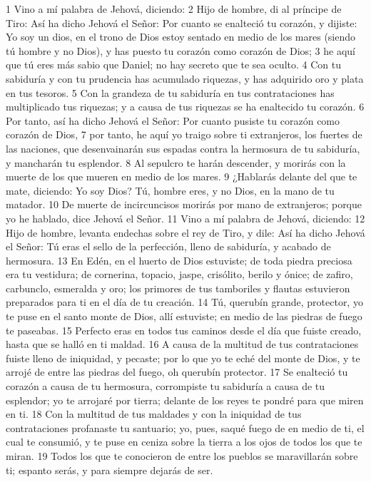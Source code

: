 1 Vino a mí palabra de Jehová, diciendo:
2 Hijo de hombre, di al príncipe de Tiro: Así ha dicho Jehová el Señor: Por cuanto se enalteció tu corazón, y dijiste: Yo soy un dios, en el trono de Dios estoy sentado en medio de los mares (siendo tú hombre y no Dios), y has puesto tu corazón como corazón de Dios;
3 he aquí que tú eres más sabio que Daniel; no hay secreto que te sea oculto.
4 Con tu sabiduría y con tu prudencia has acumulado riquezas, y has adquirido oro y plata en tus tesoros.
5 Con la grandeza de tu sabiduría en tus contrataciones has multiplicado tus riquezas; y a causa de tus riquezas se ha enaltecido tu corazón.
6 Por tanto, así ha dicho Jehová el Señor: Por cuanto pusiste tu corazón como corazón de Dios,
7 por tanto, he aquí yo traigo sobre ti extranjeros, los fuertes de las naciones, que desenvainarán sus espadas contra la hermosura de tu sabiduría, y mancharán tu esplendor.
8 Al sepulcro te harán descender, y morirás con la muerte de los que mueren en medio de los mares.
9 ¿Hablarás delante del que te mate, diciendo: Yo soy Dios? Tú, hombre eres, y no Dios, en la mano de tu matador.
10 De muerte de incircuncisos morirás por mano de extranjeros; porque yo he hablado, dice Jehová el Señor.
11 Vino a mí palabra de Jehová, diciendo:
12 Hijo de hombre, levanta endechas sobre el rey de Tiro, y dile: Así ha dicho Jehová el Señor: Tú eras el sello de la perfección, lleno de sabiduría, y acabado de hermosura.
13 En Edén, en el huerto de Dios estuviste; de toda piedra preciosa era tu vestidura; de cornerina, topacio, jaspe, crisólito, berilo y ónice; de zafiro, carbunclo, esmeralda y oro; los primores de tus tamboriles y flautas estuvieron preparados para ti en el día de tu creación.
14 Tú, querubín grande, protector, yo te puse en el santo monte de Dios, allí estuviste; en medio de las piedras de fuego te paseabas.
15 Perfecto eras en todos tus caminos desde el día que fuiste creado, hasta que se halló en ti maldad.
16 A causa de la multitud de tus contrataciones fuiste lleno de iniquidad, y pecaste; por lo que yo te eché del monte de Dios, y te arrojé de entre las piedras del fuego, oh querubín protector.
17 Se enalteció tu corazón a causa de tu hermosura, corrompiste tu sabiduría a causa de tu esplendor; yo te arrojaré por tierra; delante de los reyes te pondré para que miren en ti.
18 Con la multitud de tus maldades y con la iniquidad de tus contrataciones profanaste tu santuario; yo, pues, saqué fuego de en medio de ti, el cual te consumió, y te puse en ceniza sobre la tierra a los ojos de todos los que te miran.
19 Todos los que te conocieron de entre los pueblos se maravillarán sobre ti; espanto serás, y para siempre dejarás de ser. 

